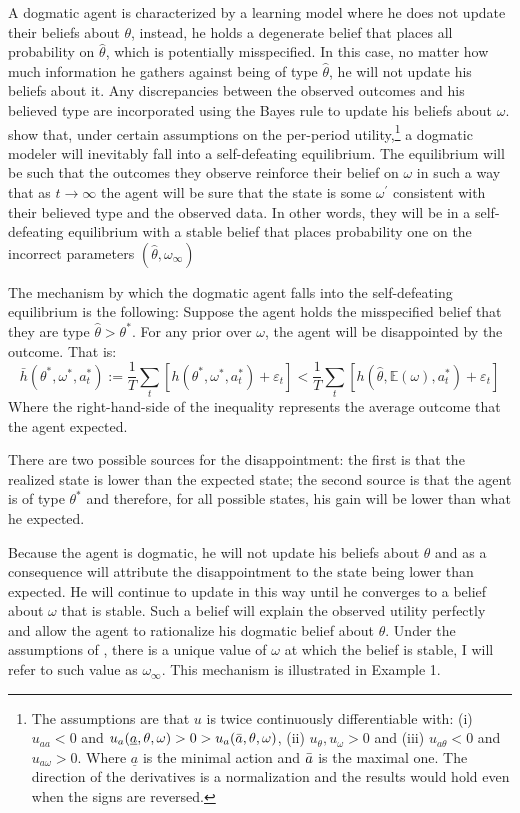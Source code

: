 \documentclass[
  12pt,
]{article}
\begin{document}
A dogmatic agent is characterized by a learning model where he does not
update their beliefs about \(\theta\), instead, he holds a degenerate
belief that places all probability on \(\hat{\theta}\), which is
potentially misspecified. In this case, no matter how much information
he gathers against being of type \(\hat{\theta}\), he will not update
his beliefs about it. Any discrepancies between the observed outcomes
and his believed type are incorporated using the Bayes rule to update
his beliefs about \(\omega\). \citet{Heidhues2018} show that, under
certain assumptions on the per-period
utility,\footnote{The assumptions are that $u$ is twice continuously differentiable with: (i)$u_{aa}<0$ and $u_a(\underline{a},  \theta, \omega)>0>u_a(\Bar{a}, \theta, \omega)$, (ii) $u_{\theta}, u_{\omega}>0$ and (iii) $u_{a\theta}<0$ and $u_{a\omega}>0$. Where $\underline{a}$ is the
minimal action and $\Bar{a}$ is the maximal one. The direction of the derivatives is a normalization
and the results would hold even when the signs are reversed.} a dogmatic
modeler will inevitably fall into a self-defeating equilibrium. The
equilibrium will be such that the outcomes they observe reinforce their
belief on \(\omega\) in such a way that as \(t\to\infty\) the agent will
be sure that the state is some \(\omega^{'}\) consistent with their
believed type and the observed data. In other words, they will be in a
self-defeating equilibrium with a stable belief that places probability
one on the incorrect parameters \((\hat{\theta}, \omega_{\infty})\)

The mechanism by which the dogmatic agent falls into the self-defeating
equilibrium is the following: Suppose the agent holds the misspecified
belief that they are type \(\hat{\theta}>\theta^*\). For any prior over
\(\omega\), the agent will be disappointed by the outcome. That is:
\[\bar{h}(\theta^*, \omega^*, a_t^*) := \frac{1}{T}\sum_t \left[h(\theta^*, \omega^*, a_t^*)+\varepsilon_t\right]<\frac{1}{T}\sum_t \left[h(\hat{\theta}, \mathbb{E}(\omega), a_t^*)+\varepsilon_t\right]\]
Where the right-hand-side of the inequality represents the average
outcome that the agent expected.

There are two possible sources for the disappointment: the first is that
the realized state is lower than the expected state; the second source
is that the agent is of type \(\theta^*\) and therefore, for all
possible states, his gain will be lower than what he expected.

Because the agent is dogmatic, he will not update his beliefs about
\(\theta\) and as a consequence will attribute the disappointment to the
state being lower than expected. He will continue to update in this way
until he converges to a belief about \(\omega\) that is stable. Such a
belief will explain the observed utility perfectly and allow the agent
to rationalize his dogmatic belief about \(\theta\). Under the
assumptions of \citet{Heidhues2018}, there is a unique value of
\(\omega\) at which the belief is stable, I will refer to such value as
\(\omega_\infty\). This mechanism is illustrated in Example 1.
\end{document}

